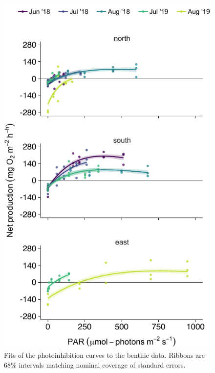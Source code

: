 \documentclass[12pt]{article}
\begin{document}
{\begin{figure}
\centering
\linespread{1}
\includegraphics{../analysis/figures/fig_nep_ben.pdf}
\caption{\label{fig:nep-ben}
Fits of the photoinhibition curves to the benthic data.
Ribbons are 68\% intervals matching nominal coverage of standard errors.
}
\end{figure}

\clearpage


}
\end{document}
